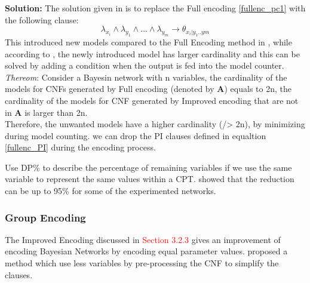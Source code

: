 \begin{itemize}
        \textbf{Solution:} The solution given in \cite{enc2} is to replace the Full encoding \ref{fullenc_pc1} with the following clause:
        \begin{equation}\label{improvedenc_pc}
            \lambda_{x_{i}} \wedge \lambda_{y_{1}} \wedge... \wedge \lambda_{y_{m}} \rightarrow \theta_{x_{i}|y_{1}..y{m}}
        \end{equation}
        This introduced new models compared to the Full Encoding method in \cite{enc1}, while according to \cite{enc2}, the newly introduced model has larger cardinality and this can be solved by adding a condition when the output is fed into the model counter.\\
        
        \noindent\textit{ Thereom}\cite{enc2}: Consider a Bayesin network with n variables, the cardinality of the models for CNFs  generated by Full encoding (denoted by \textbf{A}) equals to 2n, the cardinality of the models for CNF generated by Improved encoding that are not in \textbf{A} is larger than 2n.\\
        Therefore, the unwanted models have a higher cardinality (/> 2n), by minimizing during model counting. we can drop the PI clauses defined in equaltion \ref{fullenc_PI} during the encoding process.
        \end{itemize}
        
        \noindent Use DP\%  to describe the percentage of remaining variables if we use the same variable to represent the same values within a CPT. \cite{2008-literature-review} showed that the reduction can be up to 95\% for some of the experimented networks.\\
        
        \subsubsection{Group Encoding}
    
        The Improved Encoding discussed in \textcolor{red}{Section 3.2.3} gives an improvement of encoding Bayesian Networks by encoding equal parameter values. \cite{2006-enc3} proposed a method which use less variables by pre-processing the CNF to simplify the clauses.\\
        
